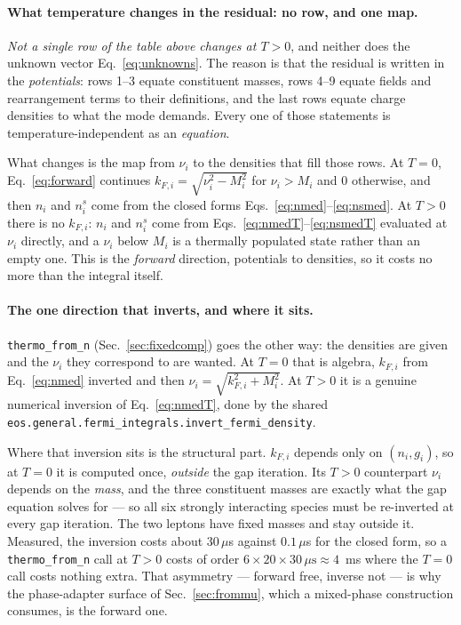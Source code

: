 \documentclass[aps,prc,onecolumn,superscriptaddress,nofootinbib,10pt]{revtex4-2}
\begin{document}
\paragraph{What temperature changes in the residual: no row, and one map.}
\emph{Not a single row of the table above changes at $T > 0$}, and neither
does the unknown vector Eq.~\eqref{eq:unknowns}. The reason is that the
residual is written in the \emph{potentials}: rows 1--3 equate constituent
masses, rows 4--9 equate fields and rearrangement terms to their definitions,
and the last rows equate charge densities to what the mode demands. Every one
of those statements is temperature-independent as an \emph{equation}.

What changes is the map from $\nu_i$ to the densities that fill those rows.
At $T = 0$, Eq.~\eqref{eq:forward} continues
$k_{F,i} = \sqrt{\nu_i^2 - M_i^2}$ for $\nu_i > M_i$ and $0$ otherwise, and
then $n_i$ and $n^s_i$ come from the closed forms
Eqs.~\eqref{eq:nmed}--\eqref{eq:nsmed}. At $T > 0$ there is no $k_{F,i}$: $n_i$
and $n^s_i$ come from Eqs.~\eqref{eq:nmedT}--\eqref{eq:nsmedT} evaluated at
$\nu_i$ directly, and a $\nu_i$ below $M_i$ is a thermally populated state
rather than an empty one. This is the \emph{forward} direction, potentials to
densities, so it costs no more than the integral itself.

\paragraph{The one direction that inverts, and where it sits.}
\texttt{thermo\_from\_n} (Sec.~\ref{sec:fixedcomp}) goes the other way: the
densities are given and the $\nu_i$ they correspond to are wanted. At $T = 0$
that is algebra, $k_{F,i}$ from Eq.~\eqref{eq:nmed} inverted and then
$\nu_i = \sqrt{k_{F,i}^2 + M_i^2}$. At $T > 0$ it is a genuine numerical
inversion of Eq.~\eqref{eq:nmedT}, done by the shared
\texttt{eos.general.fermi\_integrals.invert\_fermi\_density}.

Where that inversion sits is the structural part. $k_{F,i}$ depends only on
$(n_i, g_i)$, so at $T = 0$ it is computed once, \emph{outside} the gap
iteration. Its $T > 0$ counterpart $\nu_i$ depends on the \emph{mass}, and
the three constituent masses are exactly what the gap equation solves for ---
so all six strongly interacting species must be re-inverted at every gap
iteration. The two leptons have fixed masses and stay outside it. Measured,
the inversion costs about $30\,\mu$s against $0.1\,\mu$s for the closed form,
so a \texttt{thermo\_from\_n} call at $T > 0$ costs of order
$6 \times 20 \times 30\,\mu\mathrm{s} \approx 4$~ms where the $T = 0$ call
costs nothing extra. That asymmetry --- forward free, inverse not --- is why
the phase-adapter surface of Sec.~\ref{sec:frommu}, which a mixed-phase
construction consumes, is the forward one.
\end{document}
